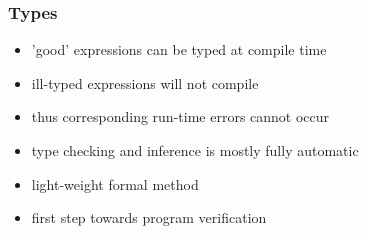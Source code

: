 \begin{multicols}{2}
\subsubsection{Types}
\begin{itemize}
  \item 'good' expressions can be typed at compile time
  \item ill-typed expressions will not compile
  \item thus corresponding run-time errors cannot occur
  \item type checking and inference is mostly fully automatic
  \item light-weight formal method
  \item first step towards program verification
\end{itemize}
\end{multicols}
